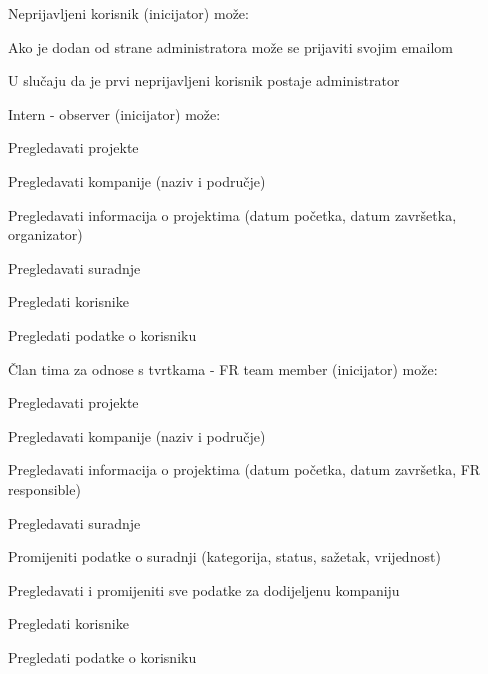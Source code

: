 			
			\begin{packed_enum}
				\item {Neprijavljeni korisnik (inicijator) može:}

				\begin{packed_enum}

					\item Ako je dodan od strane administratora može se prijaviti svojim emailom
					\item U slučaju da je prvi neprijavljeni korisnik postaje administrator

				\end{packed_enum}

				\item {Intern - observer (inicijator) može:}
				
				\begin{packed_enum}
					
					\item Pregledavati projekte
					\item Pregledavati kompanije (naziv i područje)
					\item Pregledavati informacija o projektima (datum početka, datum završetka, organizator)
					\item Pregledavati suradnje
					\item Pregledati korisnike
					\item Pregledati podatke o korisniku
					
				\end{packed_enum}

				\item {Član tima za odnose s tvrtkama - FR team member (inicijator) može:}

				\begin{packed_enum}

					\item Pregledavati projekte
					\item Pregledavati kompanije (naziv i područje)
					\item Pregledavati informacija o projektima (datum početka, datum završetka, FR responsible)
					\item Pregledavati suradnje
					\item Promijeniti podatke o suradnji (kategorija, status, sažetak, vrijednost)
					\item Pregledavati i promijeniti sve podatke za dodijeljenu kompaniju
					\item Pregledati korisnike
					\item Pregledati podatke o korisniku


\end{packed_enum}
\end{packed_enum}
